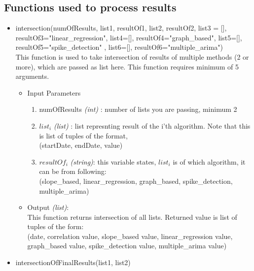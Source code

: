 \subsection{Functions used to process results}

\begin{itemize}
   
   
   \item intersection(numOfResults, list1, resultOf1, list2, resultOf2, list3 = 
[], resultOf3="linear\_regression", list4=[], resultOf4="graph\_based", 
list5=[], resultOf5="spike\_detection" , list6=[], resultOf6="multiple\_arima") 
\\
  This function is used to take intersection of results of multiple methods (2 
or more), which are passed as list here. This function requires minimum of 5 
arguments. 
   
   \begin{itemize}
 \item Input Parameters
 
 \begin{enumerate}
  \item numOfResults \textit{(int)} : number of lists you are passing, minimum 2
  \item $list_i$ \textit{(list)} : list represnting result of the i'th 
algorithm. Note that this is list of tuples of the format, \\
  (startDate, endDate, value)
  \item $resultOf_i$ \textit{(string)}: this variable states, $list_i$ is of 
which algorithm, it can be from following: \\
            (slope\_based, linear\_regression, graph\_based, spike\_detection, 
multiple\_arima)

 \end{enumerate}

 \item Output \textit{(list)}: \\
 This function returns intersection of all lists. Returned value is list of 
tuples of the form: \\
 (date, correlation value, slope\_based value, linear\_regression value, 
graph\_based value, spike\_detection value, multiple\_arima value)

 \end{itemize}
   
   
   
   
   \item intersectionOfFinalResults(list1, list2) \\
  

\end{itemize}
